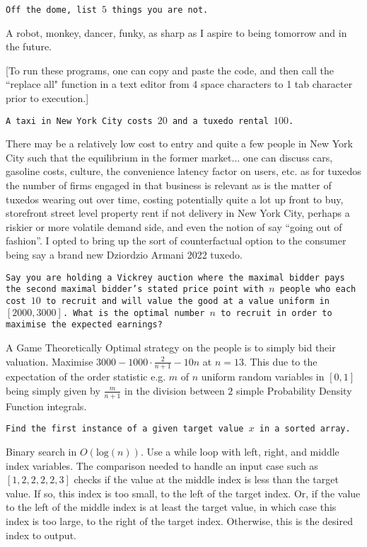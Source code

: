\texttt{Off the dome, list $5$ things you are not.}

A robot, monkey, dancer, funky, as sharp as I aspire to being tomorrow and in the future.

[To run these programs, one can copy and paste the code, and then call the ``replace all" function in a text editor from 4 space characters to 1 tab character prior to execution.]

\texttt{A taxi in New York City costs $20$ and a tuxedo rental $100$.}

There may be a relatively low cost to entry and quite a few people in New York City such that the equilibrium in the former market... one can discuss cars, gasoline costs, culture, the convenience latency factor on users, etc. as for tuxedos the number of firms engaged in that business is relevant as is the matter of tuxedos wearing out over time, costing potentially quite a lot up front to buy, storefront street level property rent if not delivery in New York City, perhaps a riskier or more volatile demand side, and even the notion of say ``going out of fashion''. I opted to bring up the sort of counterfactual option to the consumer being say a brand new Dziordzio Armani 2022 tuxedo.

\texttt{Say you are holding a Vickrey auction where the maximal bidder pays the second maximal bidder's stated price point with $n$ people who each cost $10$ to recruit and will value the good at a value uniform in $[2000, 3000]$. What is the optimal number $n$ to recruit in order to maximise the expected earnings?}

A Game Theoretically Optimal strategy on the people is to simply bid their valuation. Maximise $3000 - 1000 \cdot \frac{2}{n + 1} - 10 n$ at $n = \boxed{13}$. This due to the expectation of the order statistic e.g. $m$ of $n$ uniform random variables in $[0, 1]$ being simply given by $\frac{m}{n + 1}$ in the division between $2$ simple Probability Density Function integrals.

\texttt{Find the first instance of a given target value $x$ in a sorted array.}

Binary search in $O(\text{log}(n))$. Use a while loop with left, right, and middle index variables. The comparison needed to handle an input case such as $[1,2,2,2,2,3]$ checks if the value at the middle index is less than the target value. If so, this index is too small, to the left of the target index. Or, if the value to the left of the middle index is at least the target value, in which case this index is too large, to the right of the target index. Otherwise, this is the desired index to output.


